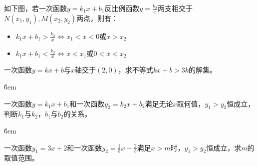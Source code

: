 \begin{theorem}
    \begin{minipage}[c]{0.55\textwidth}
        如下图，若一次函数$y=k_1x+b_1$反比例函数$y=\frac{k_2}{x}$两支相交于$N(x_1,y_1),M(x_2,y_2)$两点，则有：
        \begin{itemize}
            \item         $k_1x+b_1>\frac{k_2}{x} \Leftrightarrow x_1<x<0$或$x>x_2$
            \item           $k_1x+b_1<\frac{k_2}{x} \Leftrightarrow x<x_1$或$0<x<x_2$
        \end{itemize}
    \end{minipage}%
    \begin{minipage}[c]{0.45\textwidth}
        \centering
    \end{minipage}
\end{theorem}

\begin{example}
    一次函数$y=kx+b$与$x$轴交于$(2,0)$，求不等式$kx+b>3k$的解集。
\end{example}

\v{6em}

\begin{example}
    一次函数$y=k_1x+b_1$和一次函数$y_2=k_2x+b_2$满足无论$x$取何值，$y_1>y_2$恒成立，判断$k_1$与$k_2$，$b_1$与$b_2$的关系。
\end{example}

\v{6em}

\begin{example}
    一次函数$y_1=3x+2$和一次函数$y_2=\frac{1}{3}x-\frac{2}{3}$满足$x>m$时，$y_1>y_2$恒成立，求$m$的取值范围。
\end{example}

